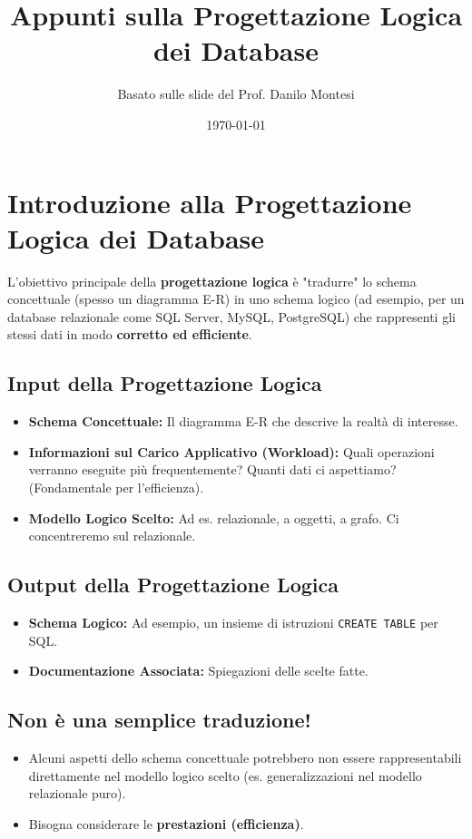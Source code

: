 \documentclass{article}
\title{Appunti sulla Progettazione Logica dei Database}
\author{Basato sulle slide del Prof. Danilo Montesi}
\date{\today}
\begin{document}
	
	\maketitle
	\tableofcontents
	\newpage
	
	\section{Introduzione alla Progettazione Logica dei Database}
	L'obiettivo principale della \textbf{progettazione logica} è "tradurre" lo schema concettuale (spesso un diagramma E-R) in uno schema logico (ad esempio, per un database relazionale come SQL Server, MySQL, PostgreSQL) che rappresenti gli stessi dati in modo \textbf{corretto ed efficiente}.
	
	\subsection{Input della Progettazione Logica}
	\begin{itemize}
		\item \textbf{Schema Concettuale:} Il diagramma E-R che descrive la realtà di interesse.
		\item \textbf{Informazioni sul Carico Applicativo (Workload):} Quali operazioni verranno eseguite più frequentemente? Quanti dati ci aspettiamo? (Fondamentale per l'efficienza).
		\item \textbf{Modello Logico Scelto:} Ad es. relazionale, a oggetti, a grafo. Ci concentreremo sul relazionale.
	\end{itemize}
	
	\subsection{Output della Progettazione Logica}
	\begin{itemize}
		\item \textbf{Schema Logico:} Ad esempio, un insieme di istruzioni \texttt{CREATE TABLE} per SQL.
		\item \textbf{Documentazione Associata:} Spiegazioni delle scelte fatte.
	\end{itemize}
	
	\subsection{Non è una semplice traduzione!}
	\begin{itemize}
		\item Alcuni aspetti dello schema concettuale potrebbero non essere rappresentabili direttamente nel modello logico scelto (es. generalizzazioni nel modello relazionale puro).
		\item Bisogna considerare le \textbf{prestazioni (efficienza)}.
	\end{itemize}
	
\end{document}
